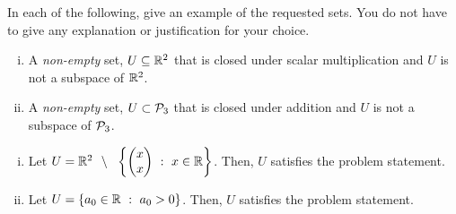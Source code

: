 \begin{question}
	\normalfont
	
	In each of the following, give an example of the requested sets.  You do not have to give any explanation or justification for your choice.
	
	\begin{enumerate}[(i)]
		\item A \emph{non-empty} set, $U\subseteq\real^2$ that is closed under scalar multiplication and $U$ is not a subspace of $\real^2$.
		
		\item A \emph{non-empty} set, $U\subset\P_3$ that is closed under addition and $U$ is not a subspace of $\P_3$.
	\end{enumerate}
\end{question}
\renewcommand{\qedsymbol}{}
\begin{sol}
    \begin{enumerate}[(i)]
        \item Let $U=\R^{2}\ \ \backslash \ \ \left\{ \colvectwo{x}{x}\ :\ x\in\R \right\}$. Then, $U$ satisfies the problem statement.
        \item Let $U=\left\{ a_0\in\R\ :\ a_0>0 \right\}$. Then, $U$ satisfies the problem statement.
    \end{enumerate}
\end{sol}
